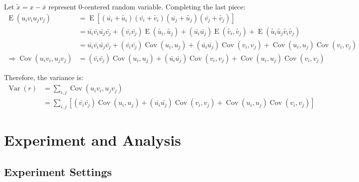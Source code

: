 \documentclass{article}
\begin{document}
Let $\tilde{x} = x - \bar{x}$ represent 0-centered random variable. Completing the last piece:
\begin{align}
    \operatorname{E}(u_i v_i u_j v_j)                & = \operatorname{E}[(\bar{u_i} + \tilde{u_i}) (\bar{v_i} + \tilde{v_i}) (\bar{u_j} + \tilde{u_j}) (\bar{v_j} + \tilde{v_j})]                                                                                                                         \\
                                                     & = \bar{u_i} \bar{v_i} \bar{u_j} \bar{v_j} + (\bar{v_i} \bar{v_j}) \operatorname{E}(\tilde{u_i}, \tilde{u_j}) + (\bar{u_i} \bar{u_j}) \operatorname{E}(\tilde{v_i}, \tilde{v_j}) + \operatorname{E}(\tilde{u_i} \tilde{u_j} \tilde{v_i} \tilde{v_j}) \\
                                                     & = \bar{u_i} \bar{v_i} \bar{u_j} \bar{v_j} + (\bar{v_i} \bar{v_j}) \operatorname{Cov}(u_i, u_j) + (\bar{u_i} \bar{u_j}) \operatorname{Cov}(v_i, v_j) + \operatorname{Cov}(u_i, u_j) \operatorname{Cov}(v_i, v_j)                                     \\
    \Rightarrow \operatorname{Cov}(u_i v_i, u_j v_j) & = (\bar{v_i} \bar{v_j}) \operatorname{Cov}(u_i, u_j) + (\bar{u_i} \bar{u_j}) \operatorname{Cov}(v_i, v_j) + \operatorname{Cov}(u_i, u_j) \operatorname{Cov}(v_i, v_j)
\end{align}

Therefore, the variance is:
\begin{align}
    \operatorname{Var}{(r)} & = \sum_{i,j} \operatorname{Cov}(u_i v_i, u_j v_j)                                                                                                                                             \\
                            & = \sum_{i,j} \left[(\bar{v_i} \bar{v_j}) \operatorname{Cov}(u_i, u_j) + (\bar{u_i} \bar{u_j}) \operatorname{Cov}(v_i, v_j) + \operatorname{Cov}(u_i, u_j) \operatorname{Cov}(v_i, v_j)\right]
\end{align}

\section{Experiment and Analysis}

\subsection{Experiment Settings}
\end{document}
